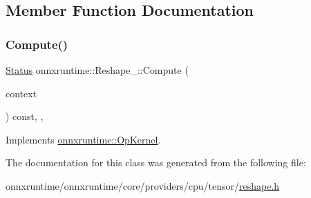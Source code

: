 \subsection{Member Function Documentation}
\mbox{\label{classonnxruntime_1_1Reshape__1_a48c62e63b3da7509b5bb5601b31b47fa}} 
\subsubsection{\texorpdfstring{Compute()}{Compute()}}
{\footnotesize\ttfamily \mbox{\hyperlink{classonnxruntime_1_1common_1_1Status}{Status}} onnxruntime\+::\+Reshape\+\_\+::\+Compute (\begin{DoxyParamCaption}\item[{\mbox{\hyperlink{classonnxruntime_1_1OpKernelContext}{Op\+Kernel\+Context}} $\ast$}]{context }\end{DoxyParamCaption}) const\hspace{0.3cm}{\ttfamily [inline]}, {\ttfamily [override]}, {\ttfamily [virtual]}}



Implements \mbox{\hyperlink{classonnxruntime_1_1OpKernel_a9eca8656a78b1b3ab9d3351a12798650}{onnxruntime\+::\+Op\+Kernel}}.



The documentation for this class was generated from the following file\+:\begin{DoxyCompactItemize}
\item 
onnxruntime/onnxruntime/core/providers/cpu/tensor/\mbox{\hyperlink{cpu_2tensor_2reshape_8h}{reshape.\+h}}\end{DoxyCompactItemize}
